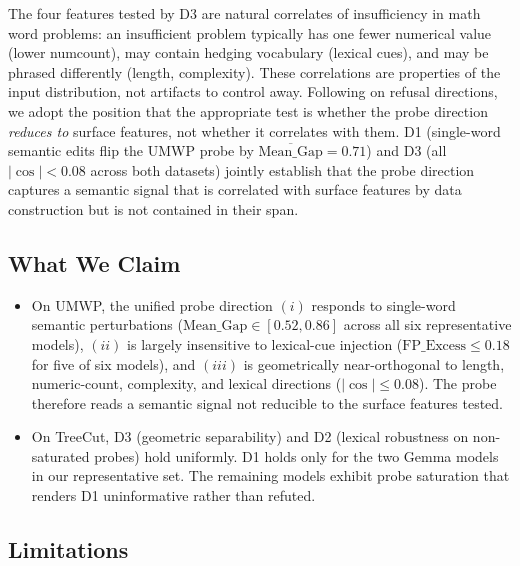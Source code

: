 The four features tested by D3 are natural correlates of insufficiency
in math word problems: an insufficient problem typically has one fewer
numerical value (lower numcount), may contain hedging vocabulary
(lexical cues), and may be phrased differently (length, complexity).
These correlations are properties of the input distribution, not
artifacts to control away. Following \citet{arditi2024refusal} on
refusal directions, we adopt the position that the appropriate test
is whether the probe direction \emph{reduces to} surface features,
not whether it correlates with them. D1 (single-word semantic edits
flip the UMWP probe by $\overline{\mathrm{Mean\_Gap}} = 0.71$) and D3
(all $|\cos| < 0.08$ across both datasets) jointly establish that
the probe direction captures a semantic signal that is correlated
with surface features by data construction but is not contained in
their span.

\subsection{What We Claim}

\begin{itemize}
\item On UMWP, the unified probe direction $(i)$ responds to
single-word semantic perturbations
($\mathrm{Mean\_Gap} \in [0.52, 0.86]$ across all six representative
models), $(ii)$ is largely insensitive to lexical-cue injection
($\mathrm{FP\_Excess} \le 0.18$ for five of six models), and
$(iii)$ is geometrically near-orthogonal to length, numeric-count,
complexity, and lexical directions ($|\cos| \le 0.08$). The probe
therefore reads a semantic signal not reducible to the surface
features tested.

\item On TreeCut, D3 (geometric separability) and D2
(lexical robustness on non-saturated probes) hold uniformly. D1
holds only for the two Gemma models in our representative set. The
remaining models exhibit probe saturation that renders D1
uninformative rather than refuted.
\end{itemize}

\subsection{Limitations}

